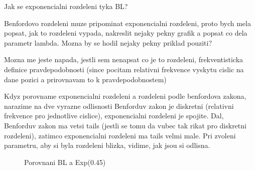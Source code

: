 \begin{koment}
    Jak se exponencialni rozdeleni tyka BL? 

    Benfordovo rozdeleni muze pripominat exponencialni rozdeleni, proto bych mela popsat, jak to rozdeleni vypada, nakreslit nejaky pekny grafik a popsat co dela parametr lambda. Mozna by se hodil nejaky pekny priklad pouziti? 

    Mozna me jeste napada, jestli sem nenapsat co je to rozdeleni, frekventisticka definice pravdepodobnosti (since pocitam relativni frekvence vyskytu cislic na dane pozici a prirovnavam to k pravdepodobnostem) 
\end{koment}

Kdyz porovname exponencialni rozdeleni a rozdeleni podle benfordova zakona, narazime na dve vyrazne odlisnosti 
Benforduv zakon je diskretni (relativni frekvence pro jednotlive cislice), exponencialni rozdeleni je spojite. Dal, Benforduv zakon ma vetsi tails (jestli se tomu da vubec tak rikat pro diskretni rozdeleni), zatimco exponencialni rozdeleni ma tails velmi male. Pri zvoleni parametru, aby si byla rozdeleni blizka, vidime, jak jsou si odlisna. 

\begin{figure}[h]
    \centering
    \caption{Porovnani BL a Exp(0.45)}
    \label{fig:Exp0.45aBL}
\end{figure}


